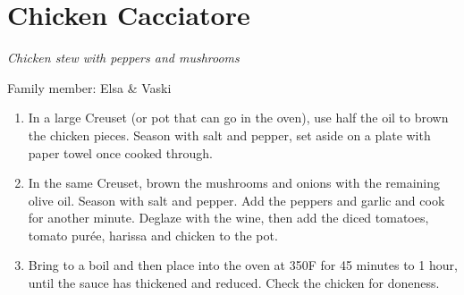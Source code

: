 \chapter{Chicken Cacciatore}
\label{ch:chickencacciatore}
\textit{Chicken stew with peppers and mushrooms}

Family member: Elsa \& Vaski


\begin{enumerate}
    \item In a large Creuset (or pot that can go in the oven), use half the oil to brown the chicken pieces. Season with salt and pepper, set aside on a plate with paper towel once cooked through.
    \item In the same Creuset, brown the mushrooms and onions with the remaining olive oil. Season with salt and pepper. Add the peppers and garlic and cook for another minute. Deglaze with the wine, then add the diced tomatoes, tomato purée, harissa and chicken to the pot.
    \item Bring to a boil and then place into the oven at 350\degree F for 45 minutes to 1 hour, until the sauce has thickened and reduced. Check the chicken for doneness.

\end{enumerate}

